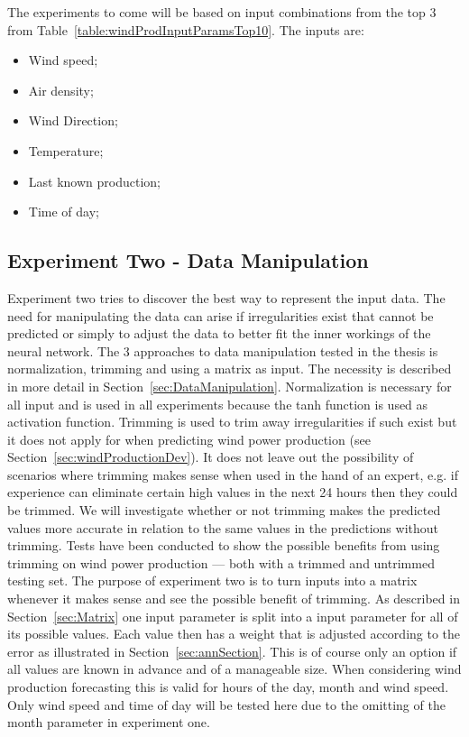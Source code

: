 The experiments to come will be based on input combinations from the top 3 from Table~\ref{table:windProdInputParamsTop10}. The inputs are:
\begin{itemize}
\item Wind speed;
\item Air density;
\item Wind Direction;
\item Temperature;
\item Last known production;
\item Time of day;
\end{itemize}
\newpage
\subsection{Experiment Two - Data Manipulation}
\label{sec:windProdExperimentTwo}
Experiment two tries to discover the best way to represent the input data. The need for manipulating the data can arise if irregularities exist that cannot be predicted or simply to adjust the data to better fit the inner workings of the neural network. The 3 approaches to data manipulation tested in the thesis is normalization, trimming and using a matrix as input. The necessity is described in more detail in Section~\ref{sec:DataManipulation}. Normalization is necessary for all input and is used in all experiments because the tanh function is used as activation function. Trimming is used to trim away irregularities if such exist but it does not apply for when predicting wind power production (see Section~\ref{sec:windProductionDev}). It does not leave out the possibility of scenarios where trimming makes sense when used in the hand of an expert, e.g. if experience can eliminate certain high values in the next 24 hours then they could be trimmed. We will investigate whether or not trimming makes the predicted values more accurate in relation to the same values in the predictions without trimming. Tests have been conducted to show the possible benefits from using trimming on wind power production --- both with a trimmed and untrimmed testing set. The purpose of experiment two is to turn inputs into a matrix whenever it makes sense and see the possible benefit of trimming. As described in Section~\ref{sec:Matrix} one input parameter is split into a input parameter for all of its possible values. Each value then has a weight that is adjusted according to the error as illustrated in Section~\ref{sec:annSection}. This is of course only an option if all values are known in advance and of a manageable size. When considering wind production forecasting this is valid for hours of the day, month and wind speed. Only wind speed and time of day will be tested here due to the omitting of the month parameter in experiment one. 

